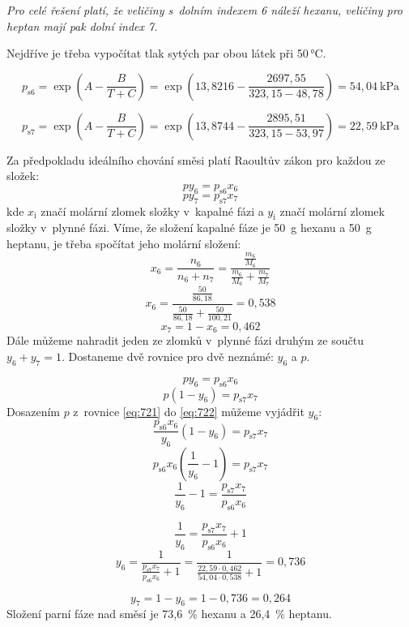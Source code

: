 \documentclass{book}
\begin{document}
\textit{Pro celé řešení platí, že veličiny s~dolním indexem 6 náleží hexanu, veličiny pro heptan mají pak dolní index 7.}

Nejdříve je třeba vypočítat tlak sytých par obou látek při 50\,°C. 

\[
p_{\mathrm{s6}}=\exp\left({A-\frac{B}{T+C}}\right)=\exp\left({13,8216-\frac{2697,55}{323,15-48,78}}\right)=54,04\ \mathrm{kPa}
\]

\[
p_{\mathrm{s7}}=\exp\left({A-\frac{B}{T+C}}\right)=\exp\left({13,8744-\frac{2895,51}{323,15-53,97}}\right)=22,59\ \mathrm{kPa}
\]

Za předpokladu ideálního chování směsi platí Raoultův zákon pro každou
ze složek: 
\[
py_{6}=p_{\mathrm{s6}}x_{6}
\]
\[
py_{7}=p_{\mathrm{s7}}x_{7}
\]
kde $x_{\mathrm{i}}$ značí molární zlomek složky v~kapalné fázi a $y_{\mathrm{i}}$ značí molární zlomek složky v~plynné fázi. Víme, že složení kapalné
fáze je 50~g hexanu a 50~g heptanu, je třeba spočítat jeho molární
složení: 
\[
x_{6}=\frac{n_{6}}{n_{6}+n_{7}}=\frac{\frac{m_{6}}{M_{6}}}{\frac{m_{6}}{M_{6}}+\frac{m_{7}}{M_{7}}}
\]
\[
x_{6}=\frac{\frac{50}{86,18}}{\frac{50}{86,18}+\frac{50}{100,21}}=0,538
\]
\[
x_{7}=1-x_{6}=0,462
\]
Dále můžeme nahradit jeden ze zlomků v~plynné fázi druhým ze součtu
$y_{6}+y_{7}=1$. Dostaneme dvě rovnice pro dvě neznámé: $y_{6}$
a $p$.

\[
py_{6}=p_{\mathrm{s6}}x_{6}\tag{1} \label{eq:721}
\]
\[
p\left(1-y_{6}\right)=p_{\mathrm{s7}}x_{7}\tag{2} \label{eq:722}
\]
Dosazením $p$ z~rovnice \eqref{eq:721} do \eqref{eq:722} můžeme vyjádřit $y_{6}$: 
\[
\frac{p_{\mathrm{s6}}x_{6}}{y_{6}}\left(1-y_{6}\right)=p_{\mathrm{s7}}x_{7}
\]
\[
p_{\mathrm{s6}}x_{6}\left(\frac{1}{y_{6}}-1\right)=p_{\mathrm{s7}}x_{7}
\]
\[
\frac{1}{y_{6}}-1=\frac{p_{\mathrm{s7}}x_{7}}{p_{\mathrm{s6}}x_{6}}
\]
 
\[
\frac{1}{y_{6}}=\frac{p_{\mathrm{s7}}x_{7}}{p_{\mathrm{s6}}x_{6}}+1
\]
\[
y_{6}=\frac{1}{\frac{p_{\mathrm{s7}}x_{7}}{p_{\mathrm{s6}}x_{6}}+1}=\frac{1}{\frac{22,59\cdot0,462}{54,04\cdot0,538}+1}=0,736
\]
 
\[
y_{7}=1-y_{6}=1-0,736=0,264
\]
Složení parní fáze nad směsí je 73,6~\% hexanu a 26,4~\% heptanu. 
\end{document}
